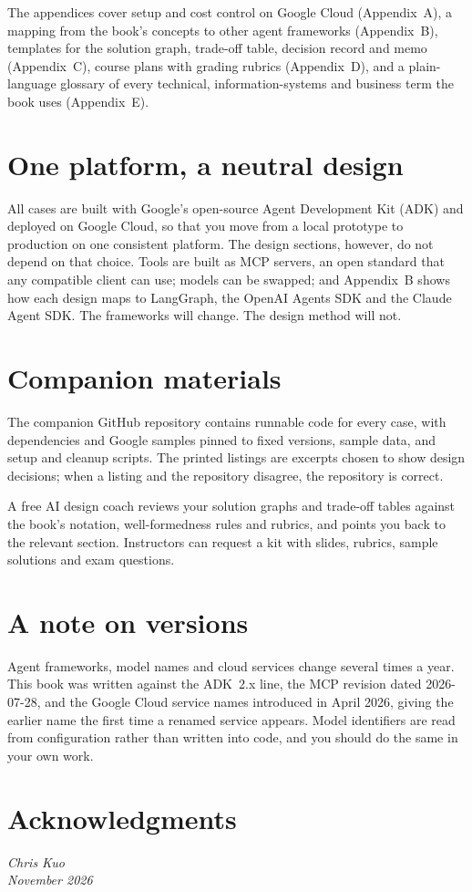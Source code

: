 The appendices cover setup and cost control on Google Cloud (Appendix~A), a mapping from the book's concepts to other agent frameworks (Appendix~B), templates for the solution graph, trade-off table, decision record and memo (Appendix~C), course plans with grading rubrics (Appendix~D), and a plain-language glossary of every technical, information-systems and business term the book uses (Appendix~E).

\section*{One platform, a neutral design}

All cases are built with Google's open-source Agent Development Kit (ADK) and deployed on Google Cloud, so that you move from a local prototype to production on one consistent platform. The design sections, however, do not depend on that choice. Tools are built as MCP servers, an open standard that any compatible client can use; models can be swapped; and Appendix~B shows how each design maps to LangGraph, the OpenAI Agents SDK and the Claude Agent SDK. The frameworks will change. The design method will not.

\section*{Companion materials}

The companion GitHub repository contains runnable code for every case, with dependencies and Google samples pinned to fixed versions, sample data, and setup and cleanup scripts. The printed listings are excerpts chosen to show design decisions; when a listing and the repository disagree, the repository is correct.

A free AI design coach reviews your solution graphs and trade-off tables against the book's notation, well-formedness rules and rubrics, and points you back to the relevant section. Instructors can request a kit with slides, rubrics, sample solutions and exam questions.

\section*{A note on versions}

Agent frameworks, model names and cloud services change several times a year. This book was written against the ADK~2.x line, the MCP revision dated 2026-07-28, and the Google Cloud service names introduced in April 2026, giving the earlier name the first time a renamed service appears. Model identifiers are read from configuration rather than written into code, and you should do the same in your own work.

\section*{Acknowledgments}


\bigskip
\noindent\textit{Chris Kuo}\\
\textit{November 2026}
